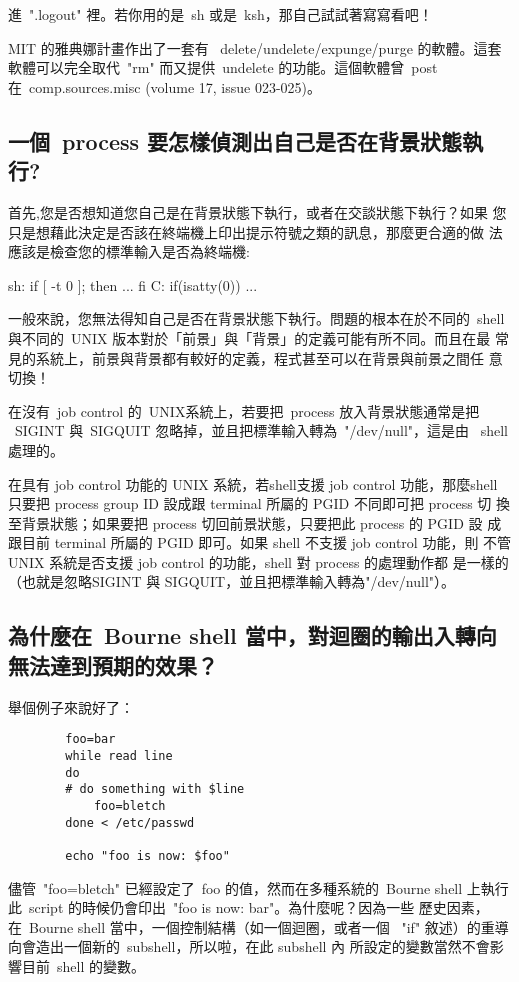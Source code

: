 \documentclass{article}
\begin{document}
\begin{CJK*}{Bg5}{ming}
	進~".logout" 裡。若你用的是~sh 或是~ksh，那自己試試著寫寫看吧！

	MIT 的雅典娜計畫作出了一套有 
        ~delete/undelete/expunge/purge 的軟體。這套軟體可以完全取代~"rm" 
	而又提供~undelete 的功能。這個軟體曾~post 在~comp.sources.misc
	(volume 17, issue 023-025)。

\subsection{一個~process 要怎樣偵測出自己是否在背景狀態執行?}

	首先,您是否想知道您自己是在背景狀態下執行，或者在交談狀態下執行？如果
	您只是想藉此決定是否該在終端機上印出提示符號之類的訊息，那麼更合適的做
	法應該是檢查您的標準輸入是否為終端機:

            sh: if [ -t 0 ]; then ... fi
            C: if(isatty(0)) { ... }

	一般來說，您無法得知自己是否在背景狀態下執行。問題的根本在於不同的~shell 
	與不同的~UNIX 版本對於「前景」與「背景」的定義可能有所不同。而且在最
	常見的系統上，前景與背景都有較好的定義，程式甚至可以在背景與前景之間任
	意切換！

	在沒有~job control 的~UNIX系統上，若要把~process 放入背景狀態通常是把 
	~SIGINT 與~SIGQUIT 忽略掉，並且把標準輸入轉為~"/dev/null"，這是由
	~shell處理的。

	在具有 job control 功能的 UNIX 系統，若shell支援 job control 功能，那麼shell
	只要把 process group ID 設成跟 terminal 所屬的 PGID 不同即可把 process 切
	換至背景狀態；如果要把 process 切回前景狀態，只要把此 process 的 PGID 設
	成跟目前 terminal 所屬的 PGID 即可。如果 shell 不支援 job control 功能，則
	不管UNIX 系統是否支援 job control 的功能，shell 對 process 的處理動作都
	是一樣的（也就是忽略SIGINT 與 SIGQUIT，並且把標準輸入轉為"/dev/null"）。

\subsection{為什麼在~Bourne shell 當中，對迴圈的輸出入轉向無法達到預期的效果？}

	舉個例子來說好了：
\begin{verbatim}
		foo=bar
		while read line
		do
		# do something with $line
		    foo=bletch
		done < /etc/passwd

		echo "foo is now: $foo"
\end{verbatim}
	儘管~"foo=bletch" 已經設定了~foo 的值，然而在多種系統的~Bourne shell 
        上執行此~script 的時候仍會印出~"foo is now: bar"。為什麼呢？因為一些
        歷史因素，在~Bourne shell 當中，一個控制結構（如一個迴圈，或者一個 
        ~"if" 敘述）的重導向會造出一個新的~subshell，所以啦，在此 subshell 內
        所設定的變數當然不會影響目前~shell 的變數。


\end{CJK*}
\end{document}

